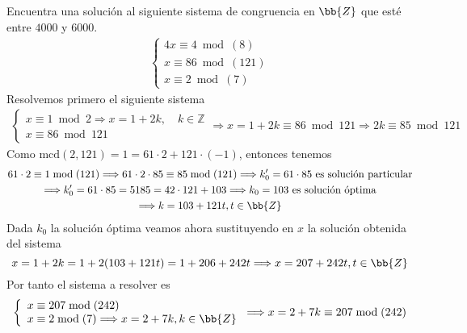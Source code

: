 \documentclass[12pt]{article}
\begin{document}
    \begin{ejercicio} [1,25 puntos]
        Encuentra una solución al siguiente sistema de congruencia en $\bb{Z}$ que esté entre $4000$ y $6000$.
        \begin{align*}
            \left\{\begin{array}{l}
                4x\equiv 4\bmod{(8)}\\ 
                x\equiv86\bmod{(121)}\\
                x\equiv2\bmod{(7)}
            \end{array}\right.
        \end{align*}
        Resolvemos primero el siguiente sistema
        \begin{align*}
            \left\{
            \begin{array}{l}
                x \equiv 1 \bmod{2} \Longrightarrow x = 1 + 2k, \quad k \in \mathbb{Z} \\
                x \equiv 86 \bmod{121}
            \end{array}
            \right.
            \Longrightarrow x = 1 + 2k \equiv 86 \bmod{121}
            \Longrightarrow 2k \equiv 85 \bmod{121}
        \end{align*}
        Como $\text{mcd}(2,121)=1=61\cdot2+121\cdot(-1)$, entonces tenemos
        \begin{multline*}
            61\cdot2\equiv1\bmod{(121)}\Longrightarrow61\cdot2\cdot85\equiv85\bmod{(121)}
            \Longrightarrow k_0'=61\cdot85 \text{ es solución particular} \\
            \Longrightarrow k_0'=61\cdot85=5185=42\cdot121+103\Longrightarrow k_0=103 \text{ es solución óptima} \\
            \Longrightarrow k=103+121t, t\in\bb{Z}
        \end{multline*}
        Dada $k_0$ la solución óptima veamos ahora sustituyendo en $x$ la solución obtenida del sistema
        \begin{equation*}
            x=1+2k=1+2(103+121t)=1+206+242t\Longrightarrow x=207+242t, t\in\bb{Z}
        \end{equation*}
        Por tanto el sistema a resolver es
        \begin{align*}
            \left\{\begin{array}{l}
                x\equiv207\bmod{(242)}\\
                x\equiv2\bmod{(7)}\Longrightarrow x=2+7k, k\in\bb{Z}
            \end{array}\right. &\Longrightarrow x=2+7k\equiv207\bmod{(242)}\\

\end{align*}
\end{ejercicio}
\end{document}
